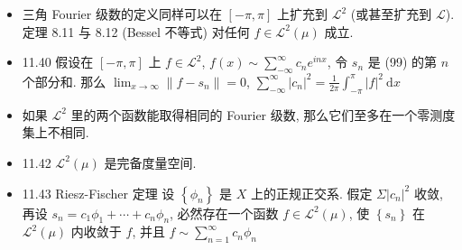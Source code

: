 \begin{itemize}
\item 三角 Fourier 级数的定义同样可以在 $[-\pi, \pi]$ 上扩充到 $\mathscr{L}^{2}$ (或甚至扩充到 $\mathscr{L}$). 定理 8.11 与 8.12 (Bessel 不等式) 对任何 $f \in \mathscr{L}^{2}(\mu)$ 成立.

\item 11.40 假设在 $[-\pi, \pi]$ 上 $f \in \mathscr{L}^{2}$, $f(x) \sim \sum_{-\infty}^{\infty} c_{n} e^{i n x}$, 令 $s_{n}$ 是 (99) 的第 $n$ 个部分和. 那么 $\lim _{x \rightarrow \infty}\left\|f-s_{n}\right\|=0$, $\sum_{-\infty}^{\infty}\left|c_{n}\right|^{2}=\frac{1}{2 \pi} \int_{-\pi}^{\pi}|f|^{2} \mathrm{~d} x$

\item 如果 $\mathscr{L}^{2}$ 里的两个函数能取得相同的 Fourier 级数, 那么它们至多在一个零测度集上不相同.

\item 11.42 $\mathscr{L}^{2}(\mu)$ 是完备度量空间.

\item 11.43 Riesz-Fischer 定理 设 $\left\{\phi_{n}\right\}$ 是 $X$ 上的正规正交系. 假定 $\Sigma\left|c_{n}\right|^{2}$ 收敛, 再设 $s_{n}=c_{1} \phi_{1}+\cdots+c_{n} \phi_{n}$, 必然存在一个函数 $f \in \mathscr{L}^{2}(\mu)$, 使 $\left\{s_{n}\right\}$ 在 $\mathscr{L}^{2}(\mu)$ 内收敛于 $f$, 并且 $f \sim \sum_{n=1}^{\infty} {c}_{n} \phi_{n}$

\end{itemize}

